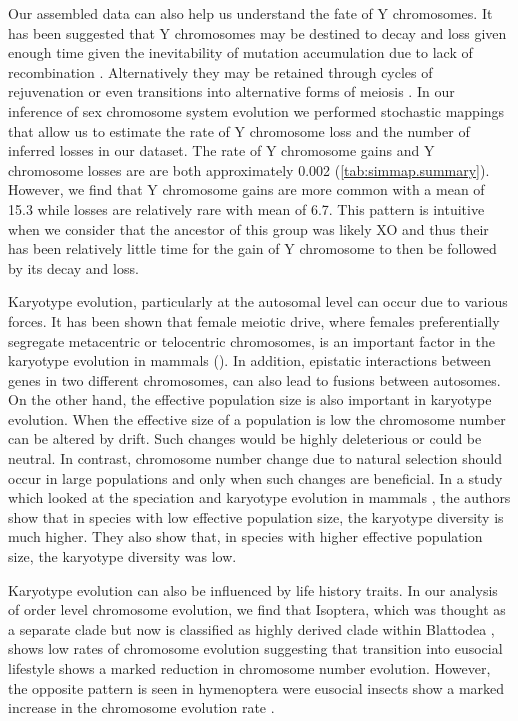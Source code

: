 Our assembled data can also help us understand the fate of Y chromosomes. 
It has been suggested that Y chromosomes may be destined to decay and loss given enough time given the inevitability of mutation accumulation due to lack of recombination \citep{steinemann2005}.
Alternatively they may be retained through cycles of rejuvenation or even transitions into alternative forms of meiosis \citep{blackmon2015bioessay}.
In our inference of sex chromosome system evolution we performed stochastic mappings that allow us to estimate the rate of Y chromosome loss and the number of inferred losses in our dataset.
The rate of Y chromosome gains and Y chromosome losses are are both approximately 0.002 (\cref{tab:simmap.summary}). %
However, we find that Y chromosome gains are more common with a mean of 15.3 while losses are relatively rare with mean of 6.7.
This pattern is intuitive when we consider that the ancestor of this group was likely XO and thus their has been relatively little time for the gain of Y chromosome to then be followed by its decay and loss.%

Karyotype evolution, particularly at the autosomal level can occur due to various forces.
It has been shown that female meiotic drive, where females preferentially segregate metacentric or telocentric chromosomes, is an important factor in the karyotype evolution in mammals (\citep{de2001female, blackmon2019meiotic}).
In addition, epistatic interactions between genes in two different chromosomes, can also lead to fusions between autosomes. 
On the other hand, the effective population size is also important in karyotype evolution.
When the effective size of a population is low the chromosome number can be altered by drift. 
Such changes would be highly deleterious or could be neutral. 
In contrast, chromosome number change due to natural selection should occur in large populations and only when such changes are beneficial.
In a study which looked at the speciation and karyotype evolution in mammals \citep{bush1977rapid}, the authors show that in species with low effective population size, the karyotype diversity is much higher.
They also show that, in species with higher effective population size, the karyotype diversity was low.

Karyotype evolution can also be influenced by life history traits. 
In our analysis of order level chromosome evolution, we find that Isoptera, which was thought as a separate clade but now is classified as highly derived clade within Blattodea , shows low rates of chromosome evolution suggesting that transition into eusocial lifestyle shows a marked reduction in chromosome number evolution.
However, the opposite pattern is seen in hymenoptera were eusocial insects show a marked increase in the chromosome evolution rate \citep{ross2015}.

